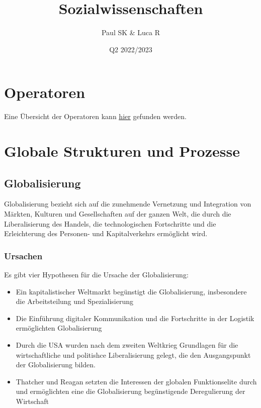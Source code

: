 \documentclass{article}
\title{Sozialwissenschaften}
\date{Q2 2022/2023}
\author{Paul SK \& Luca R}
\begin{document}
	\maketitle
	\newpage


	\section{Operatoren}
	Eine Übersicht der Operatoren kann \href{https://www.standardsicherung.schulministerium.nrw.de/cms/zentralabitur-gost/faecher/getfile.php?file=3947}{\underline{hier}} gefunden werden. 

	\section{Globale Strukturen und Prozesse}

	\subsection{Globalisierung}
	Globalisierung bezieht sich auf die zunehmende Vernetzung und Integration von Märkten, Kulturen und Gesellschaften auf der ganzen Welt, die durch die Liberalisierung des Handels, die technologischen Fortschritte und die Erleichterung des Personen- und Kapitalverkehrs ermöglicht wird.

	\subsubsection{Ursachen}
	Es gibt vier Hypothesen für die Ursache der Globalisierung:

	\begin{itemize}
		\item Ein kapitalistischer Weltmarkt begünstigt die Globalisierung, insbesondere die Arbeitsteilung und Spezialisierung
		\item Die Einführung digitaler Kommunikation und die Fortschritte in der Logistik ermöglichten Globalisierung
		\item Durch die USA wurden nach dem zweiten Weltkrieg Grundlagen für die wirtschaftliche und politishce Liberalisierung gelegt, die den Ausgangspunkt der Globalisierung bilden.
		\item Thatcher und Reagan setzten die Interessen der globalen Funktionselite durch und ermöglichten eine die Globalisierung begünstigende Deregulierung der Wirtschaft
	\end{itemize}
\end{document}
